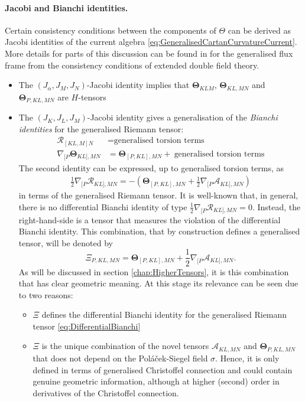 \documentclass[11pt,a4paper]{article}
\numberwithin{equation}{section}
\begin{document}
\paragraph{Jacobi and Bianchi identities.} Certain consistency conditions between the components of $\Theta$ can be derived as Jacobi identities of the current algebra \eqref{eq:GeneralisedCartanCurvatureCurrent}. More details for parts of this discussion can be found in \cite{Butter:2022iza} for the generalised flux frame from the consistency conditions of extended double field theory.
\begin{itemize}
    \item The $(J_\alpha , J_M , J_N)$-Jacobi identity implies that $\mathbf{\Theta}_{KLM}$, $\mathbf{\Theta}_{KL,MN}$ and $\mathbf{\Theta}_{P,KL,MN}$ are $H$-tensors
    
    \item The $(J_K , J_L , J_M)$-Jacobi identity gives a generalisation of the \textit{Bianchi identities} for the generalised Riemann tensor:
    \begin{align}
        \mathcal{R}_{[KL,M]N} &= \text{generalised torsion terms} \\
        \nabla_{[P} \mathbf{\Theta}_{KL],MN} &= \mathbf{\Theta}_{[P,KL],MN} + \ \text{generalised torsion terms}
    \end{align}
    The second identity can be expressed, up to generalised torsion terms, as
    \begin{align}
        \frac{1}{2} \nabla_{[P} \mathcal{R}_{KL],MN} = - \left( \mathbf{\Theta}_{[P,KL],MN} + \frac{1}{2} \nabla_{[P} \mathcal{A}_{KL],MN} \right) \label{eq:DifferentialBianchi}
    \end{align}
    in terms of the generalised Riemann tensor. It is well-known \cite{Hohm:2011si} that, in general, there is no differential Bianchi identity of type $\frac{1}{2} \nabla_{[P} \mathcal{R}_{KL],MN} = 0$. Instead, the right-hand-side is a tensor that measures the violation of the differential Bianchi identity. This combination, that by construction defines a generalised tensor, will be denoted by
    \begin{equation}
         \Xi_{P,KL,MN} = \mathbf{\Theta}_{[P,KL],MN} + \frac{1}{2} \nabla_{[P} \mathcal{A}_{KL],MN}.
    \end{equation}
    As will be discussed in section \ref{chap:HigherTensors}, it is this combination that has clear geometric meaning. At this stage its relevance can be seen due to two reasons:
    \begin{itemize}
        \item $\Xi$ defines the differential Bianchi identity for the generalised Riemann tensor \eqref{eq:DifferentialBianchi}
        \item $\Xi$ is the unique combination of the novel tensors $\mathcal{A}_{KL,MN}$ and $\mathbf{\Theta}_{P,KL,MN}$ that does not depend on the Poláček-Siegel field $\sigma$. Hence, it is only defined in terms of generalised Christoffel connection and could contain genuine geometric information, although at higher (second) order in derivatives of the Christoffel connection.
    \end{itemize}
\end{itemize}
\end{document}
